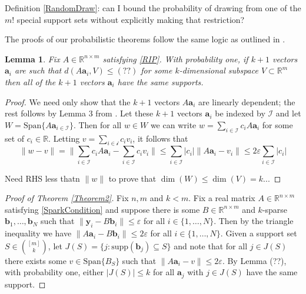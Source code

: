 \documentclass[journal, onecolumn]{IEEEtran}
\newtheorem{lemma}{Lemma}
\begin{document}
Definition \ref{RandomDraw}: can I bound the probability of drawing from one of the $m!$ special support sets without explicitly making that restriction?

The proofs of our probabilistic theorems follow the same logic as outlined in \cite{HS11}. 

\begin{lemma}
Fix $A \in \mathbb{R}^{n \times m}$ satisfying \eqref{RIP}. With probability one, if $k+1$ vectors $\mathbf{a}_i$ are such that $d(A\mathbf{a}_i,V) \leq (??)$ for some $k$-dimensional subspace $V \subset \mathbb{R}^m$ then all of the $k+1$ vectors $\mathbf{a}_i$ have the same supports.
\end{lemma}
\begin{proof}
We need only show that the $k+1$ vectors $A\mathbf{a}_i$ are linearly dependent; the rest follows by Lemma 3 from \cite{HS11}. Let these $k+1$ vectors $\mathbf{a}_i$ be indexed by $\mathcal{I}$ and let $W = \text{Span}\{A\mathbf{a}_{i \in \mathcal{I}}\}$. Then for all $w \in W$ we can write $w = \sum_{i \in \mathcal{I}} c_iA\mathbf{a}_i$ for some set of $c_i \in \mathbb{R}$. Letting $v = \sum_{i \in \mathcal{i}} c_iv_i$, it follows that
\[ \|w - v\| = \|\sum_{i \in \mathcal{I}} c_i A\mathbf{a}_i - \sum_{i \in \mathcal{I}} c_i v_i \| 
\leq \sum_{i \in \mathcal{I}} |c_i| \|A\mathbf{a}_i - v_i\| \leq 2\varepsilon \sum_{i \in \mathcal{I}}|c_i| \]

Need RHS less thatn $\|w\|$ to prove that $\dim(W) \leq \dim(V) = k$...
\end{proof}

\begin{proof}[Proof of Theorem \ref{Theorem2}]
Fix $n, m$ and $k < m$. Fix a real matrix $A \in \mathbb{R}^{n \times m}$ satisfying \eqref{SparkCondition} and suppose there is some $B \in \mathbb{R}^{n \times m}$ and $k$-sparse $\mathbf{b}_1, \ldots, \mathbf{b}_N$ such that $\|\mathbf{y}_i - B\mathbf{b}_i\| \leq \varepsilon$ for all $i \in \{1, \ldots, N\}$. Then by the triangle inequality we have $\|A\mathbf{a}_i - B\mathbf{b}_i\| \leq 2\varepsilon$ for all $i \in \{1, \ldots, N\}$. Given a support set $S \in {[m]\choose k}$, let $J(S) = \{j: \text{supp}(\mathbf{b}_j) \subseteq S\}$ and note that for all $j \in J(S)$ there exists some $v \in \text{Span}\{B_S\}$ such that $\|A\mathbf{a}_i - v\| \leq 2\varepsilon$. By Lemma (??), with probability one, either $|J(S)| \leq k$ for all $\mathbf{a}_j$ with $j \in J(S)$ have the same support.
\end{proof}
\end{document}
